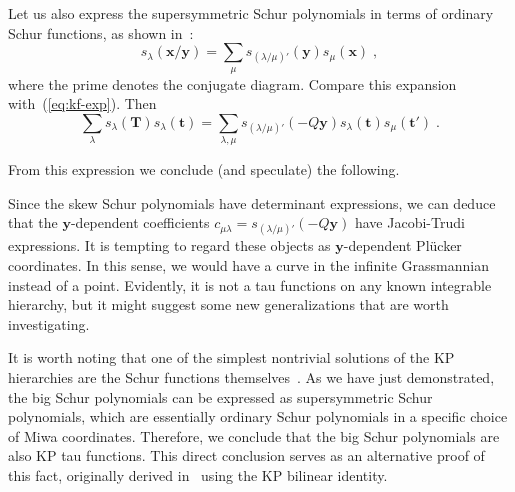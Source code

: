\documentclass[a4paper,11pt]{amsart}
\begin{document}
Let us also express the supersymmetric Schur polynomials in terms of
ordinary Schur functions, as shown in~\cite[Sec. I.5, exerc. 23]{Macdonald:1998}:
\begin{equation}
  s_{\lambda}(\bm{x}/\bm{y}) = \sum_\mu s_{(\lambda/\mu)'}(\bm{y}) s_\mu(\bm{x})\; ,
\end{equation}
where the prime denotes the conjugate diagram. Compare this expansion
with~(\ref{eq:kf-exp}). Then
\begin{equation}
  \label{eq:tau-hl}
  \sum_{\lambda } s_\lambda(\bm{T}) s_\lambda(\bm{t}) =
  \sum_{\lambda,\mu } s_{(\lambda/\mu)'}(- Q\bm{y}) s_\lambda(\bm{t}) s_\mu(\bm{t}')\; .
\end{equation}

From this expression we conclude (and speculate) the following. 

\begin{remark}
Since the skew Schur polynomials have determinant expressions, we can
deduce that the \(\bm{y}\)-dependent coefficients \(c_{\mu \lambda} =
s_{(\lambda/\mu)'}(-Q\bm{y})\) have Jacobi-Trudi expressions.  It is
tempting to regard these objects as \(\bm{y}\)-dependent Plücker
coordinates.  In this sense, we would have a curve in the infinite
Grassmannian instead of a point. Evidently, it is not a tau functions
on any known integrable hierarchy, but it might suggest some new
generalizations that are worth investigating.
\end{remark}

\begin{remark}
It is worth noting that one of the simplest nontrivial solutions of
the KP hierarchies are the Schur functions
themselves~\emph{\cite{Zabrodin2018}}. As we have just demonstrated, the big
Schur polynomials can be expressed as supersymmetric Schur
polynomials, which are essentially ordinary Schur polynomials in a
specific choice of Miwa coordinates. Therefore, we conclude that the
big Schur polynomials are also KP tau functions. This direct
conclusion serves as an alternative proof of this fact, originally derived
in~\emph{\cite{Necoechea:2019wbg}} using the KP bilinear identity.
\end{remark}
\end{document}
